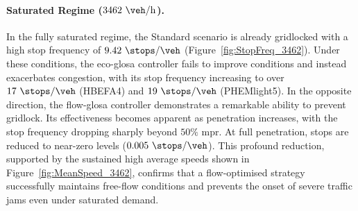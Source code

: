 \paragraph{Saturated Regime ($3462~\unit{\veh\per\hour}$).}
In the fully saturated regime, the Standard scenario is already gridlocked with a high stop frequency of $9.42~\unit{\stops\per\veh}$ (Figure~\vref{fig:StopFreq_3462}). Under these conditions, the \ac{eco-glosa} controller fails to improve conditions and instead exacerbates congestion, with its stop frequency increasing to over $17~\unit{\stops\per\veh}$ (HBEFA4) and $19~\unit{\stops\per\veh}$ (PHEMlight5). In the opposite direction, the \ac{flow-glosa} controller demonstrates a remarkable ability to prevent gridlock. Its effectiveness becomes apparent as penetration increases, with the stop frequency dropping sharply beyond $50\%$ \ac{mpr}. At full penetration, stops are reduced to near-zero levels ($0.005~\unit{\stops\per\veh}$). This profound reduction, supported by the sustained high average speeds shown in Figure~\vref{fig:MeanSpeed_3462}, confirms that a flow-optimised strategy successfully maintains free-flow conditions and prevents the onset of severe traffic jams even under saturated demand.

